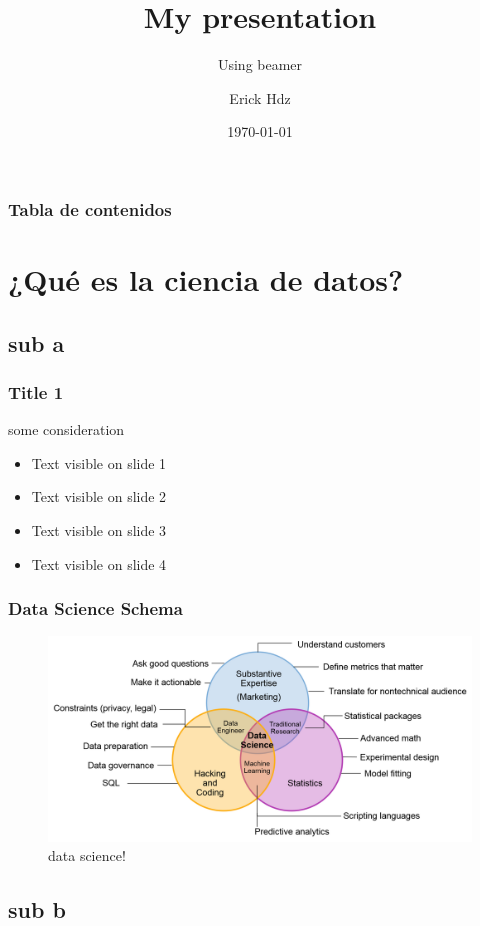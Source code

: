 \documentclass{beamer}
\title{My presentation}
\subtitle{Using beamer}
\author{Erick Hdz}
\institute{Sicuentame}
\date{\today}
\begin{document}
    \begin{frame}
        \titlepage
    \end{frame}

    \begin{frame}
        \frametitle{Tabla de contenidos}
        \tableofcontents
    \end{frame}
    
    \section{¿Qué es la ciencia de datos?}
    \subsection{ sub a}

    \begin{frame}
        \frametitle{Title 1}
        some consideration
        \begin{itemize}
            \item<1-> Text visible on slide 1
            \item<2-> Text visible on slide 2
            \item<3-> Text visible on slide 3
            \item<4->Text visible on slide 4
        \end{itemize}
    \end{frame}

    \begin{frame}
        \frametitle{Data Science Schema}
        \begin{figure}
            \includegraphics[scale=0.25]{datascience_skills_venn_diagram2}
            \caption{data science!}
        \end{figure}
    \end{frame}

    \subsection{ sub b}
\end{document}
